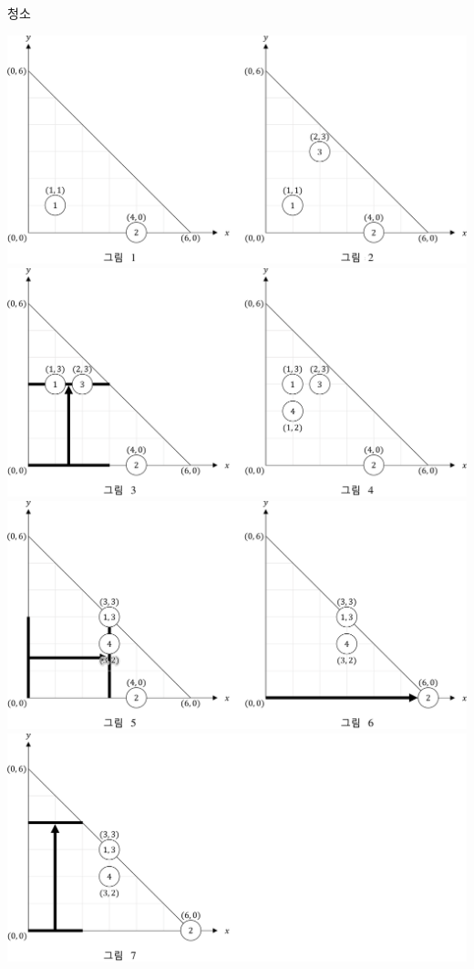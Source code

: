 \begin{problem}{청소}
	\begin{center}
	\includegraphics[width=\linewidth]{img2.png}
	\includegraphics[width=\linewidth]{img3.png}
	\includegraphics[width=\linewidth]{img4.png}
	\includegraphics[width=\linewidth]{img5.png}
	\end{center}



\end{problem}
